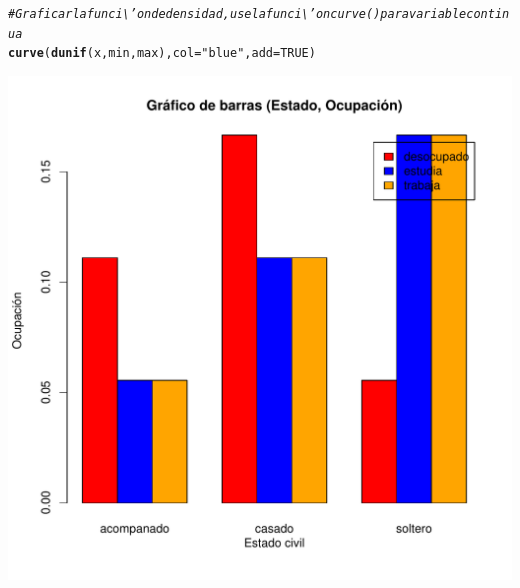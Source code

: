 \documentclass[12pt,letterpaper]{article}\usepackage[]{graphicx}\usepackage[]{color}
\makeatletter
\def\maxwidth{ %
  \ifdim\Gin@nat@width>\linewidth
    \linewidth
  \else
    \Gin@nat@width
  \fi
}
\newcommand{\hlnum}[1]{\textcolor[rgb]{0.686,0.059,0.569}{#1}}%
\newcommand{\hlstr}[1]{\textcolor[rgb]{0.192,0.494,0.8}{#1}}%
\newcommand{\hlcom}[1]{\textcolor[rgb]{0.678,0.584,0.686}{\textit{#1}}}%
\newcommand{\hlstd}[1]{\textcolor[rgb]{0.345,0.345,0.345}{#1}}%
\newcommand{\hlkwc}[1]{\textcolor[rgb]{0.333,0.667,0.333}{#1}}%
\newcommand{\hlkwd}[1]{\textcolor[rgb]{0.737,0.353,0.396}{\textbf{#1}}}%
\newenvironment{kframe}{%
 \def\at@end@of@kframe{}%
 \ifinner\ifhmode%
  \def\at@end@of@kframe{\end{minipage}}%
  \begin{minipage}{\columnwidth}%
 \fi\fi%
 \def\FrameCommand##1{\hskip\@totalleftmargin \hskip-\fboxsep
 \colorbox{shadecolor}{##1}\hskip-\fboxsep
     \hskip-\linewidth \hskip-\@totalleftmargin \hskip\columnwidth}%
 \MakeFramed {\advance\hsize-\width
   \@totalleftmargin\z@ \linewidth\hsize
   \@setminipage}}%
 {\par\unskip\endMakeFramed%
 \at@end@of@kframe}
\newenvironment{knitrout}{}{} %
\makeatother
\begin{document}
\begin{knitrout}
\begin{kframe}
\begin{alltt}
\hlcom{# Graficar la funci\textbackslash{}'on de densidad, use la funci\textbackslash{}'on curve() para variable continua }
\hlkwd{curve}\hlstd{(}\hlkwd{dunif}\hlstd{(x, min, max),} \hlkwc{col}\hlstd{=}\hlstr{"blue"}\hlstd{,} \hlkwc{add}\hlstd{=}\hlnum{TRUE}\hlstd{)}
\end{alltt}
\end{kframe}
\includegraphics[width=\maxwidth]{figure/unnamed-chunk-15-1} 

\end{knitrout}
\end{document}
